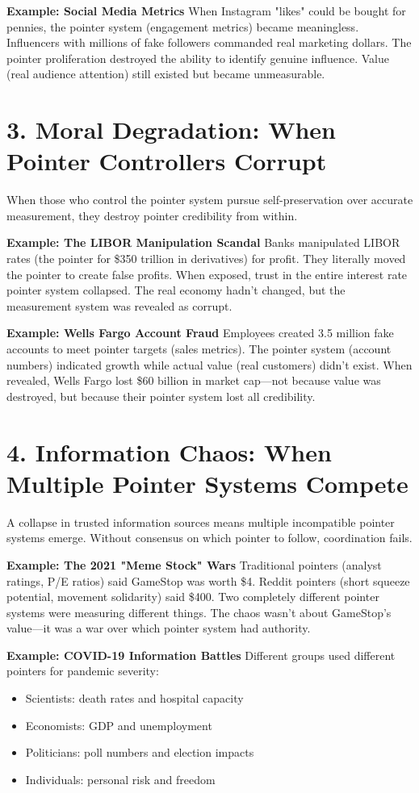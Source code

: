 \documentclass[11pt,oneside]{book}
\begin{document}
\textbf{Example: Social Media Metrics}
When Instagram "likes" could be bought for pennies, the pointer system (engagement metrics) became meaningless. Influencers with millions of fake followers commanded real marketing dollars. The pointer proliferation destroyed the ability to identify genuine influence. Value (real audience attention) still existed but became unmeasurable.

\section{3. Moral Degradation: When Pointer Controllers Corrupt}

When those who control the pointer system pursue self-preservation over accurate measurement, they destroy pointer credibility from within.

\textbf{Example: The LIBOR Manipulation Scandal}
Banks manipulated LIBOR rates (the pointer for \$350 trillion in derivatives) for profit. They literally moved the pointer to create false profits. When exposed, trust in the entire interest rate pointer system collapsed. The real economy hadn't changed, but the measurement system was revealed as corrupt.

\textbf{Example: Wells Fargo Account Fraud}
Employees created 3.5 million fake accounts to meet pointer targets (sales metrics). The pointer system (account numbers) indicated growth while actual value (real customers) didn't exist. When revealed, Wells Fargo lost \$60 billion in market cap—not because value was destroyed, but because their pointer system lost all credibility.
\section{4. Information Chaos: When Multiple Pointer Systems Compete}

A collapse in trusted information sources means multiple incompatible pointer systems emerge. Without consensus on which pointer to follow, coordination fails.

\textbf{Example: The 2021 "Meme Stock" Wars}
Traditional pointers (analyst ratings, P/E ratios) said GameStop was worth \$4. Reddit pointers (short squeeze potential, movement solidarity) said \$400. Two completely different pointer systems were measuring different things. The chaos wasn't about GameStop's value—it was a war over which pointer system had authority.

\textbf{Example: COVID-19 Information Battles}
Different groups used different pointers for pandemic severity:
\begin{itemize}
\item Scientists: death rates and hospital capacity
\item Economists: GDP and unemployment
\item Politicians: poll numbers and election impacts
\item Individuals: personal risk and freedom
\end{itemize}
\end{document}
